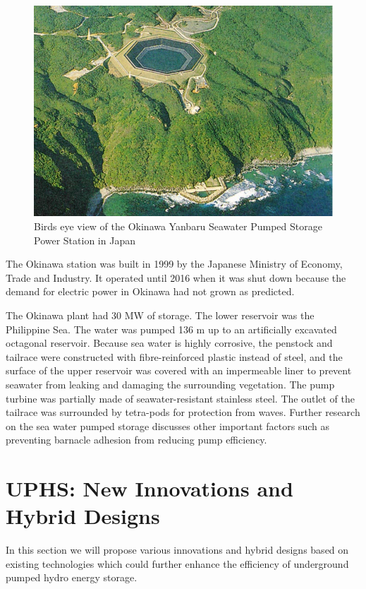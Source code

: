 \documentclass[hidelinks,12pt,a4paper]{article}
\begin{document}
\begin{figure}[ht!]
    \centering
    \includegraphics[width=.7\textwidth]{kaprun-hydroelectric-station.png}
    \caption{Birds eye view of the Okinawa Yanbaru Seawater Pumped Storage Power Station in Japan \cite{DevelopmentOfPumpTurbineForSeawaterPumpedStorage}}
\end{figure}

The Okinawa station was built in 1999 by the Japanese Ministry of Economy, Trade and Industry. It operated until 2016 when it was shut down because the demand for electric power in Okinawa had not grown as predicted. \cite{ExperimentalPowerPlantInKunigamiDismantled}

The Okinawa plant had 30 MW of storage. The lower reservoir was the Philippine Sea. The water was pumped 136 m up to an artificially excavated octagonal reservoir. Because sea water is highly corrosive, the
penstock and tailrace were constructed with fibre-reinforced plastic instead of steel, and the surface of the upper reservoir was covered with an impermeable liner to prevent seawater from leaking and damaging the surrounding vegetation. The pump turbine was partially made of seawater-resistant stainless steel. \cite{SeaWaterPumpedStoragePowerPlant} The outlet of the tailrace was  surrounded by tetra-pods for protection from waves. \cite{DevelopmentOfPumpTurbineForSeawaterPumpedStorage} Further research on the sea water pumped storage discusses other important factors such as preventing barnacle adhesion from reducing pump efficiency. \cite{DevelopmentOfPumpTurbineForSeawaterPumpedStorage}


\pagebreak[4]
\section{UPHS: New Innovations and Hybrid Designs}
In this section we will propose various innovations and hybrid designs based on existing technologies which could further enhance the efficiency of underground pumped hydro energy storage.
\end{document}
